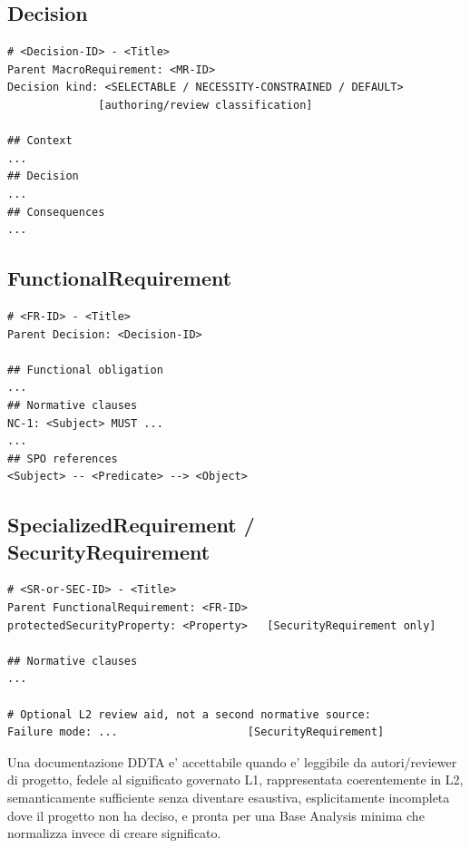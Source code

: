 \documentclass[11pt,a4paper]{article}
\begin{document}
\subsection{Decision}
\begin{lstlisting}
# <Decision-ID> - <Title>
Parent MacroRequirement: <MR-ID>
Decision kind: <SELECTABLE / NECESSITY-CONSTRAINED / DEFAULT>
              [authoring/review classification]

## Context
...
## Decision
...
## Consequences
...
\end{lstlisting}

\subsection{FunctionalRequirement}
\begin{lstlisting}
# <FR-ID> - <Title>
Parent Decision: <Decision-ID>

## Functional obligation
...
## Normative clauses
NC-1: <Subject> MUST ...
...
## SPO references
<Subject> -- <Predicate> --> <Object>
\end{lstlisting}

\subsection{SpecializedRequirement / SecurityRequirement}
\begin{lstlisting}
# <SR-or-SEC-ID> - <Title>
Parent FunctionalRequirement: <FR-ID>
protectedSecurityProperty: <Property>   [SecurityRequirement only]

## Normative clauses
...

# Optional L2 review aid, not a second normative source:
Failure mode: ...                    [SecurityRequirement]
\end{lstlisting}

\begin{ddtacore}[title={Final acceptance rule}]
Una documentazione DDTA e' accettabile quando e' leggibile da autori/reviewer di progetto, fedele al significato governato L1, rappresentata coerentemente in L2, semanticamente sufficiente senza diventare esaustiva, esplicitamente incompleta dove il progetto non ha deciso, e pronta per una Base Analysis minima che normalizza invece di creare significato.
\end{ddtacore}
\end{document}
